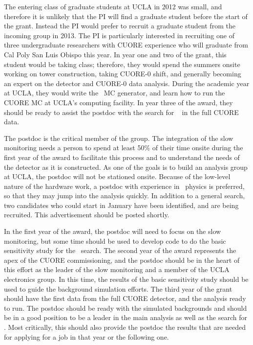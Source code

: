 The entering class of graduate students at UCLA in 2012 was small, and therefore it is unlikely that the PI will find a graduate student before the start of the grant. Instead the PI would prefer to recruit a graduate student from the incoming group in 2013. The PI is particularly interested in recruiting one of three undergraduate researchers with CUORE experience who will graduate from Cal Poly San Luis Obispo this year. In year one and two of the grant, this student would be taking class; therefore, they would spend the summers onsite working on tower construction, taking CUORE-0 shift, and generally becoming an expert on the detector and CUORE-0 data analysis. During the academic year at UCLA, they would write the \maj~MC generator, and learn how to run the CUORE MC at UCLA's computing facility. In year three of the award, they should be ready to assist the postdoc with the search for \maj~ in the full CUORE data.

The postdoc is the critical member of the group. The integration of the slow monitoring needs a person to spend at least 50\% of their time onsite during the first year of the award to facilitate this process and to understand the needs of the detector as it is constructed. As one of the goals is to build an analysis group at UCLA, the postdoc will not be stationed onsite. Because of the low-level nature of the hardware work, a postdoc with experience in \zeronu~physics is preferred, so that they may  jump into the analysis quickly.  In addition to a general search, two candidates who could start in January have been identified, and are being recruited. This advertisement should be posted shortly. 

In the first year of the award, the postdoc will need to focus on the slow monitoring, but some time should be used to develop code to do the basic sensitivity study for the \maj~search. The second year of the award represents the apex of the CUORE commissioning, and the postdoc should be in the heart of this effort as the leader of the slow monitoring and a member of the UCLA electronics group. In this time, the results of the basic sensitivity study should be used to guide the background simulation efforts. The third year of the grant should have the first data from the full CUORE detector, and the analysis ready to run. The postdoc should be ready with the simulated backgrounds and should be in a good position to be a leader in the main analysis as well as the search for \maj. Most critically, this should also provide the postdoc the results that are needed for applying for a job in that year or the following one.

